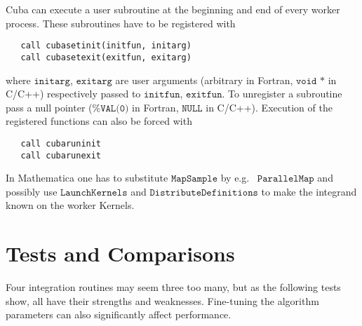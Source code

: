 \documentclass[12pt]{article}
\newcommand\eg{e.g.\ }
\newcommand\Code[1]{\ensuremath{\texttt{#1}}}
\begin{document}
Cuba can execute a user subroutine at the beginning and end of every 
worker process.  These subroutines have to be registered with
\begin{verbatim}
   call cubasetinit(initfun, initarg)
   call cubasetexit(exitfun, exitarg)
\end{verbatim}
where \Code{initarg}, \Code{exitarg} are user arguments (arbitrary in
Fortran, \Code{void *} in C/C++) respectively passed to \Code{initfun},
\Code{exitfun}.  To unregister a subroutine pass a null pointer
(\Code{\%VAL(0)} in Fortran, \Code{NULL} in C/C++).  Execution of
the registered functions can also be forced with
\begin{verbatim}
   call cubaruninit
   call cubarunexit
\end{verbatim}

In Mathematica one has to substitute \Code{MapSample} by \eg 
\Code{ParallelMap} and possibly use \Code{LaunchKernels} and 
\Code{DistributeDefinitions} to make the integrand known on the worker 
Kernels.


\section{Tests and Comparisons}
\label{sect:tests}

Four integration routines may seem three too many, but as the following 
tests show, all have their strengths and weaknesses.  Fine-tuning the 
algorithm parameters can also significantly affect performance.
\end{document}
